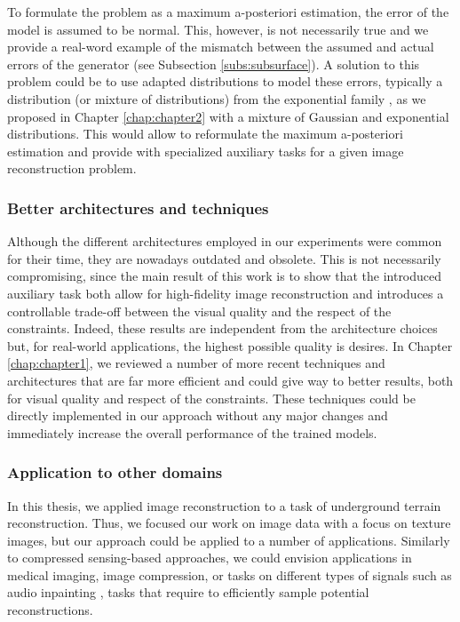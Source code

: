 To formulate the problem as a maximum a-posteriori estimation, the error of the model is assumed to be normal. This, however, is not necessarily true and we provide a real-word example of the mismatch between the assumed and actual errors of the generator (see Subsection \ref{subs:subsurface}). A solution to this problem could be to use adapted distributions to model these errors, typically a distribution (or mixture of distributions) from the exponential family \citep{Brown1986}, as we proposed in Chapter \ref{chap:chapter2} with a mixture of Gaussian and exponential distributions. This would allow to reformulate the maximum a-posteriori estimation and provide with specialized auxiliary tasks for a given image reconstruction problem.

\subsubsection*{Better architectures and techniques}

Although the different architectures employed in our experiments were common for their time, they are nowadays outdated and obsolete. This is not necessarily compromising, since the main result of this work is to show that the introduced auxiliary task both allow for high-fidelity image reconstruction and introduces a controllable trade-off between the visual quality and the respect of the constraints. Indeed, these results are independent from the architecture choices but, for real-world applications, the highest possible quality is desires. In Chapter \ref{chap:chapter1}, we reviewed a number of more recent techniques and architectures that are far more efficient and could give way to better results, both for visual quality and respect of the constraints. These techniques could be directly implemented in our approach without any major changes and immediately increase the overall performance of the trained models.

\subsubsection*{Application to other domains}

In this thesis, we applied image reconstruction to a task of underground terrain reconstruction. Thus, we focused our work on image data with a focus on texture images, but our approach could be applied to a number of applications. Similarly to compressed sensing-based approaches, we could envision applications in medical imaging, image compression, or tasks on different types of signals such as audio inpainting \citep{Marafioti2018}, tasks that require to efficiently sample potential reconstructions.

